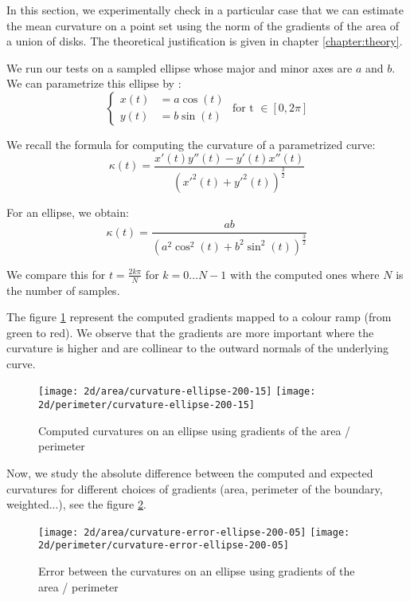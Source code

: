 In this section, we experimentally check in a particular case that we can
estimate the mean curvature on a point set using the norm of the gradients of
the area of a union of disks. The theoretical justification is given in chapter
\ref{chapter:theory}.

We run our tests on a sampled ellipse whose major and minor axes are $ a $ and $
b $. We can parametrize this ellipse by :
$$
\begin{cases}
    x(t) &= a \cos (t) \\
    y(t) &= b \sin (t)
\end{cases}
\text{ for t } \in [ 0, 2\pi ]
$$

We recall the formula for computing the curvature of a parametrized curve:
$$ \kappa(t) = \frac{x'(t) y''(t) - y'(t) x''(t)}{(x'^2(t) +
    y'^2(t))^{\frac{3}{2}} } $$

For an ellipse, we obtain:
$$ \kappa(t) = \frac{ab}{(a^2 \cos^2(t) + b^2 \sin^2(t))^{\frac{3}{2}} } $$

We compare this for $ t = \frac{2 k \pi}{N} $ for $ k = 0 \ldots N - 1 $ with
the computed ones where $ N $ is the number of samples.

The figure \ref{fig:2d-curvature-ellipse} represent the computed gradients mapped
to a colour ramp (from green to red). We observe that the gradients are more
important where the curvature is higher and are collinear to the outward normals
of the underlying curve.

\begin{figure}[h]
    \centering

    \texttt{[image: 2d/area/curvature-ellipse-200-15]}
    \texttt{[image: 2d/perimeter/curvature-ellipse-200-15]}
    \caption{Computed curvatures on an ellipse using gradients of the area /
        perimeter}
    \label{fig:2d-curvature-ellipse}
\end{figure}


Now, we study the absolute difference between the computed and expected
curvatures for different choices of gradients (area, perimeter of the boundary,
weighted...), see the figure \ref{fig:2d-curvature-error-ellipse}.

\begin{figure}[h]
    \centering

    \texttt{[image: 2d/area/curvature-error-ellipse-200-05]}
    \texttt{[image: 2d/perimeter/curvature-error-ellipse-200-05]}
    \caption{Error between the curvatures on an ellipse using gradients of the
        area / perimeter}
    \label{fig:2d-curvature-error-ellipse}
\end{figure}

